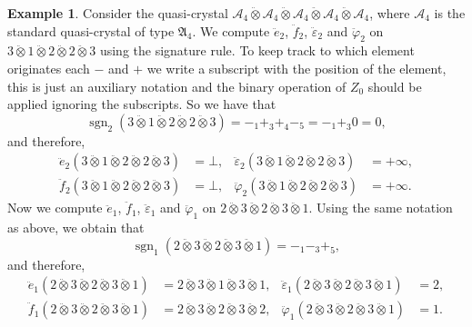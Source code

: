\documentclass[a4paper,reqno]{amsart}
\numberwithin{equation}{section}
\theoremstyle{plain}
\theoremstyle{definition}
\newtheorem{exa}[thm]{Example}
\theoremstyle{remark}
\newcommand*{\tA}{\mathfrak{A}}
\newcommand*{\undf}{\bot}  %
\DeclareMathOperator{\sgn}{sgn}       %
\newcommand*{\qcrst}[1]{\mathcal{#1}}
\newcommand*{\qKoe}{\ddot{e}}
\newcommand*{\qKof}{\ddot{f}}
\newcommand*{\qKoec}{\ddot{\varepsilon}}
\newcommand*{\qKofc}{\ddot{\varphi}}
\newcommand*{\dotimes}{\mathbin{\ddot{\otimes}}}  %
\newcommand*{\qtpsgn}{\sgn}              %
\newcommand*{\qctA}{\qcrst{A}}
\begin{document}
\begin{exa}
\label{exa:qcqtpsr}
Consider the quasi-crystal $\qctA_4 \dotimes \qctA_4 \dotimes \qctA_4 \dotimes \qctA_4 \dotimes \qctA_4$, where $\qctA_4$ is the standard quasi-crystal of type $\tA_4$.
We compute $\qKoe_2$, $\qKof_2$, $\qKoec_2$ and $\qKofc_2$ on $3 \dotimes 1 \dotimes 2 \dotimes 2 \dotimes 3$ using the signature rule.
To keep track to which element originates each $-$ and $+$ we write a subscript with the position of the element, this is just an auxiliary notation and the binary operation of $Z_0$ should be applied ignoring the subscripts.
So we have that
\[ \qtpsgn_2 (3 \dotimes 1 \dotimes 2 \dotimes 2 \dotimes 3) = {-_1} {+_3} {+_4} {-_5} = {-_1} {+_3} 0 = 0, \]
and therefore,
\begin{align*}
\qKoe_2 (3 \dotimes 1 \dotimes 2 \dotimes 2 \dotimes 3) &= \undf,
& \qKoec_2 (3 \dotimes 1 \dotimes 2 \dotimes 2 \dotimes 3) &= +\infty,\\
\qKof_2 (3 \dotimes 1 \dotimes 2 \dotimes 2 \dotimes 3) &= \undf,
& \qKofc_2 (3 \dotimes 1 \dotimes 2 \dotimes 2 \dotimes 3) &= +\infty.
\end{align*}
Now we compute $\qKoe_1$, $\qKof_1$, $\qKoec_1$ and $\qKofc_1$ on $2 \dotimes 3 \dotimes 2 \dotimes 3 \dotimes 1$.
Using the same notation as above, we obtain that
\[ \qtpsgn_1 (2 \dotimes 3 \dotimes 2 \dotimes 3 \dotimes 1) = {-_1} {-_3} {+_5}, \]
and therefore,
\begin{align*}
\qKoe_1 (2 \dotimes 3 \dotimes 2 \dotimes 3 \dotimes 1) &= 2 \dotimes 3 \dotimes 1 \dotimes 3 \dotimes 1,
& \qKoec_1 (2 \dotimes 3 \dotimes 2 \dotimes 3 \dotimes 1) &= 2,\\
\qKof_1 (2 \dotimes 3 \dotimes 2 \dotimes 3 \dotimes 1) &= 2 \dotimes 3 \dotimes 2 \dotimes 3 \dotimes 2,
& \qKofc_1 (2 \dotimes 3 \dotimes 2 \dotimes 3 \dotimes 1) &= 1.
\end{align*}
\end{exa}
\end{document}
